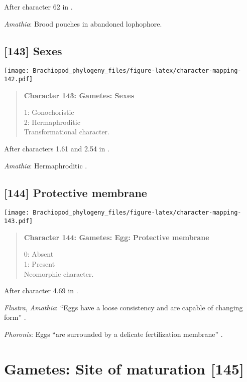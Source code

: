 \documentclass[openany]{book}
\theoremstyle{definition}
\theoremstyle{definition}
\theoremstyle{definition}
\theoremstyle{remark}
\begin{document}
After character 62 in \citet{Haszprunar2000}.

\hypertarget{Amathia-coding-142}{}
\emph{Amathia}: Brood pouches in abandoned lophophore.

\subsection*{{[}143{]} Sexes}\label{sexes}

\texttt{[image: Brachiopod\_phylogeny\_files/figure-latex/character-mapping-142.pdf]}

\begin{quote}
\textbf{Character 143: Gametes: Sexes}

1: Gonochoristic\\
2: Hermaphroditic\\
Transformational character.
\end{quote}

After characters 1.61 and 2.54 in \citet{SPS1996}.

\hypertarget{Amathia-coding-143}{}
\emph{Amathia}: Hermaphroditic \citep{Reed1988}.

\subsection*{{[}144{]} Protective membrane}\label{protective-membrane}

\texttt{[image: Brachiopod\_phylogeny\_files/figure-latex/character-mapping-143.pdf]}

\begin{quote}
\textbf{Character 144: Gametes: Egg: Protective membrane}

0: Absent\\
1: Present\\
Neomorphic character.
\end{quote}

After character 4.69 in \citet{SPS1996}.

\hypertarget{Amathia-coding-144}{}
\emph{Flustra}, \emph{Amathia}: ``Eggs have a loose consistency and are
capable of changing form'' \citep{Franzen1977}.

\hypertarget{Phoronis-coding-144}{}
\emph{Phoronis}: Eggs ``are surrounded by a delicate fertilization
membrane'' \citep{Pennerstorfer2012}.

\section{Gametes: Site of maturation
{[}145{]}}\label{gametes-site-of-maturation-145}
\end{document}

